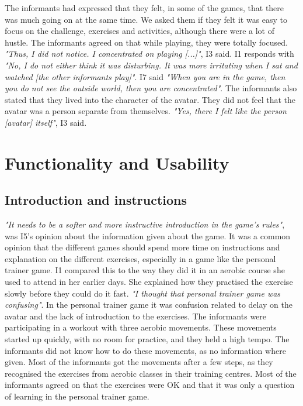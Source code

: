 The informants had expressed that they felt, in some of the games, that there was much going on at the same time. We asked them if they felt it was easy to focus on the challenge, exercises and activities, although there were a lot of hustle. The informants agreed on that while playing, they were totally focused. \emph{"Thus, I did not notice. I concentrated on playing [...]"}, I3 said. I1 responds with \emph{"No, I do not either think it was disturbing. It was more irritating when I sat and watched [the other informants play]"}. I7 said \emph{"When you are in the game, then you do not see the outside world, then you are concentrated"}. The informants also stated that they lived into the character of the avatar. They did not feel that the avatar was a person separate from themselves. \emph{"Yes, there I felt like the person [avatar] itself"}, I3 said. 

\section{Functionality and Usability}
\subsection{Introduction and instructions}
\emph{"It needs to be a softer and more instructive introduction in the game's rules"}, was I5's opinion about the information given about the game. It was a common opinion that the different games should spend more time on instructions and explanation on the different exercises, especially in a game like the personal trainer game. I1 compared this to the way they did it in an aerobic course she used to attend in her earlier days. She explained how they practised the exercise slowly before they could do it fast. \emph{"I thought that personal trainer game was confusing"}. In the personal trainer game it was confusion related to delay on the avatar and the lack of introduction to the exercises. The informants were participating in a workout with three aerobic movements. These movements started up quickly, with no room for practice, and they held a high tempo. The informants did not know how to do these movements, as no information where given. Most of the informants got the movements after a few steps, as they recognised the exercises from aerobic classes in their training centres. Most of the informants agreed on that the exercises were OK and that it was only a question of learning in the personal trainer game. 


